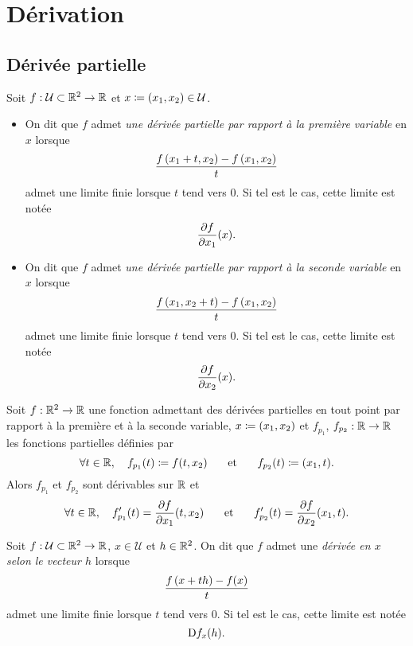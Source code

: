 \documentclass{magnolia}
\begin{document}
\section{Dérivation}



\subsection{Dérivée partielle}

\begin{definition}
Soit $f:\mathcal{U}\subset\mathbb{R}^2\to\mathbb{R}$ et $x\coloneqq\left(x_1,x_2\right)\in\mathcal{U}$.
\begin{itemize}
\item On dit que $f$ admet \emph{une dérivée partielle par rapport à la première variable} en
  $x$ lorsque
  \[\frac{f\left(x_1+t,x_2\right)-f\left(x_1,x_2\right)}{t}\]
  admet une limite finie lorsque $t$ tend vers 0. Si tel est le cas, cette
  limite est notée
  \[\frac{\partial f}{\partial x_1}(x).\]
\item On dit que $f$ admet \emph{une dérivée partielle par rapport à la seconde variable} en
  $x$ lorsque
  \[\frac{f\left(x_1,x_2+t\right)-f\left(x_1,x_2\right)}{t}\]
  admet une limite finie lorsque $t$ tend vers 0. Si tel est le cas, cette
  limite est notée
  \[\frac{\partial f}{\partial x_2}(x).\]
\end{itemize}
\end{definition}


\begin{remarqueUnique}
\remarque Soit $f:\mathbb{R}^2\to\mathbb{R}$ une fonction admettant des dérivées partielles en tout point
  par rapport à la première et à la seconde variable, $x\coloneqq (x_1,x_2)$
  et $f_{p_1}$, $f_{p_2}:\mathbb{R}\to\mathbb{R}$ les fonctions partielles définies par
  \[\forall t\in\mathbb{R},\quad f_{p_1}(t)\coloneqq f(t, x_2)
    \quad\quad\!\text{et}\quad\!\quad
    f_{p_2}(t)\coloneqq (x_1,t).\]
  Alors $f_{p_1}$ et $f_{p_2}$ sont dérivables sur $\mathbb{R}$ et
  \[\forall t\in\mathbb{R},\quad f_{p_1}'(t)=\frac{\partial f}{\partial x_1}(t,x_2) \quad\quad\!\text{et}\quad\!\quad
    f_{p_2}'(t)=\frac{\partial f}{\partial x_2}(x_1,t).\]
\end{remarqueUnique}

\begin{definition}
Soit $f:\mathcal{U}\subset\mathbb{R}^2\to\mathbb{R}$, $x\in\mathcal{U}$ et $h\in\mathbb{R}^2$. On dit
que $f$ admet une \emph{dérivée en $x$ selon le vecteur $h$} lorsque
\[\frac{f\left(x+th\right)-f(x)}{t}\]
admet une limite finie lorsque $t$ tend vers 0. Si tel est le cas, cette limite
est notée
\[{\rm D}f_x(h).\]
\end{definition}
\end{document}
